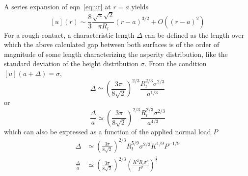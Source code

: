 \documentclass[pre,groupedaddress,showkeys,showpacs,twocolumn]{revtex4}
\begin{document}
%
A series expansion of eqn~\ref{eq:ur} at $r=a$ yields
%
\begin{equation}
	\left[ u \right] \left( r \right) \sim \frac{8}{3}\frac{\sqrt a \sqrt 2}{\pi R_l}\left(r-a \right)^{3/2}+O((r-a)^2)
\end{equation}
%
For a rough contact, a characteristic length $\Delta$ can be defined as the length over which the above calculated gap between both surfaces is of the order of magnitude of some length characterizing the asperity distribution, like the standard deviation of the height distribution $\sigma$. From the condition $\left[u\right]\left(a+\Delta\right)=\sigma$,
%
\begin{equation}
	\Delta \simeq \left( \frac{3 \pi}{8 \sqrt 2}\right )^{2/3}\frac{R_l^{2/3} \sigma^{2/3}}{a^{1/3}}
\end{equation}
%
or
%
\begin{equation}
	\frac{\Delta}{a} \simeq \left( \frac{3 \pi}{8 \sqrt 2}\right )^{2/3}\frac{R_l^{2/3} \sigma^{2/3}}{a^{4/3}}
\end{equation}
%
which can also be expressed as a function of the applied normal load $P$
%
\begin{equation}
	\begin{split}
		\Delta &\simeq \left( \frac{3 \pi}{8 \sqrt 2}\right )^{2/3} R_l^{5/9} \sigma^{2/3} K^{1/9} P^{-1/9}\\
		\frac{\Delta}{a}&\simeq \left( \frac{3 \pi}{8 \sqrt 2}\right )^{2/3} \left( \frac{K^2R_l\sigma^3}{P^2} \right)^{\frac{2}{9}}
	\end{split}
	\label{eq:deltac}
\end{equation}
%
\end{document}
